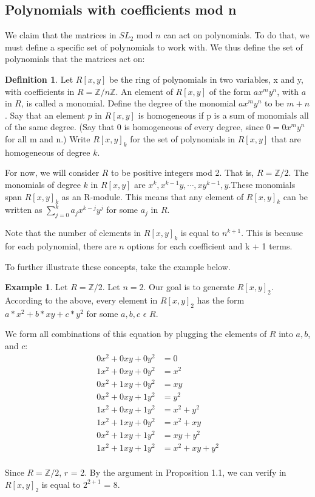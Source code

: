 \documentclass[a4paper,draft]{amsproc}
\theoremstyle{plain}
\theoremstyle{definition}
\newtheorem{exm}{Example}[section]
\newtheorem{dfn}{Definition}[section]
\theoremstyle{remark}
\numberwithin{equation}{section}
\begin{document}
\subsection{Polynomials with coefficients mod n}
We claim that the matrices in $SL_{2}$ mod $n$ can act on polynomials. To do that, we must define a specific set of polynomials to work with. 
We thus define the set of polynomials that the matrices act on: 
\begin{dfn}
Let $R[x,y]$ be the ring of polynomials in two variables, x and y, with coefficients in $R = \mathbb{Z}/n\mathbb{Z}$. An element of $R[x,y]$ of the form  $ax^{m}y^{n}$, with $a$ in $R$, is called a monomial. Define the degree of the monomial $ax^{m}y^{n}$ to be $m+n$. Say that an element $p$ in $R[x,y]$ is homogeneous if p is a sum of monomials all of the same degree. (Say that 0 is homogeneous of every degree, since $0=0x^{m}y^{n}$ for all m and n.) Write $R[x,y]_{k}$ for the set of polynomials in $R[x,y]$ that are homogeneous of degree $k$.
\end{dfn}
For now, we will consider $R$ to be positive integers mod 2. That is, $R = \mathbb{Z}/2$. The monomials of degree $k$ in $R[x,y]$ are $x^k, x^{k-1}y, \cdots, xy^{k-1}, y$.These monomials span $R[x,y]_{k}$ as an R-module. This means that any element of $R[x,y]_{k}$ can be written as $\sum_{j=0}^k a_jx^{k-j}y^j$ for some $a_{j}$ in $R$. 

Note that the number of elements in $R[x,y]_{k}$ is equal to $n^{k + 1}$. This is because for each polynomial, there are $n$ options for each coefficient and k + 1 terms.
 
To further illustrate these concepts, take the example below. 
\begin{exm}
Let $R = \mathbb{Z}/2$.  Let $n = 2$. Our goal is to generate $R[x,y]_{2}$. 
According to the above, every element in $R[x,y]_{2}$ has the form $a*x^{2} + b*xy + c*y^{2}$ for some $a, b, c$ $\epsilon$  $R$.

We form all combinations of this equation by plugging the elements of $R$ into $a, b$, and $c$: 
\begin{align*}
0x^{2} + 0xy + 0y^{2} &= 0 \\
1x^{2} + 0xy + 0y^{2} &= x^{2} \\
0x^{2} +1xy + 0y^{2}  &= xy \\
0x^{2} + 0xy + 1y^{2} &= y^{2} \\
1x^{2} + 0xy + 1y^{2} &= x^{2} + y^{2} \\
1x^{2} + 1xy + 0y^{2} &= x^{2} + xy \\
0x^{2} + 1xy + 1y^{2} &= xy + y^{2} \\
1x^{2} + 1xy + 1y^{2}  &= x^{2} + xy + y^{2}\\
\end{align*}

Since  $R = \mathbb{Z}/2$, $r$ = 2. By the argument in Proposition 1.1, we can verify  in $R[x,y]_{2}$ is equal to $2^{2 + 1}$ = 8.
\end{exm}
\end{document}
